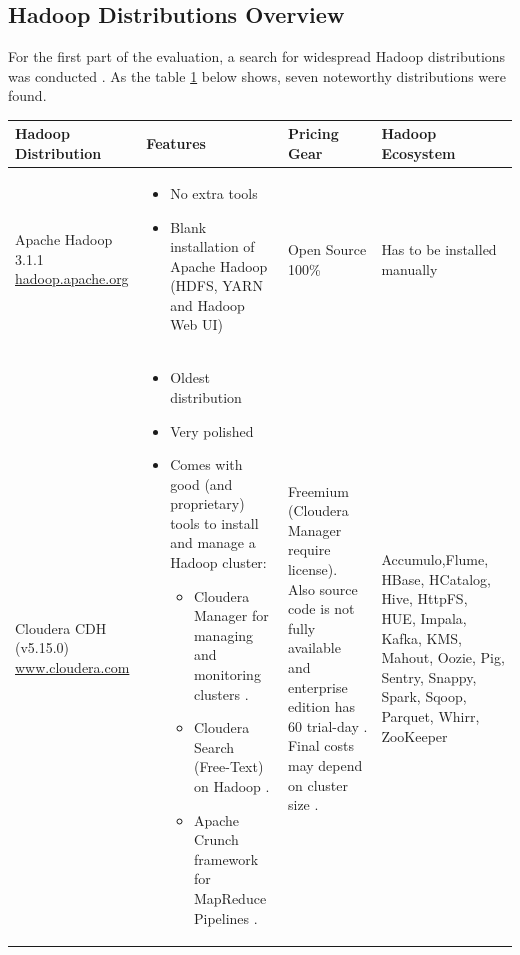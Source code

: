 \subsection{Hadoop Distributions Overview}\label{hd}
For the first part of the evaluation, a search for widespread Hadoop distributions was conducted \citep{hadoopvendors,forrester,comparison2014,Cloudera,M.Heo2015}.
As the table \ref{tab:distributions} below shows, seven noteworthy distributions were found.
\begin{table}[H]
\hspace{-3.3cm}
\begin{tabular}{|p{4.4cm}|p{6.2cm}|p{4cm}|p{4cm}|}
	\hline
	\textbf{Hadoop \newline Distribution} & \textbf{Features} & \textbf{ Pricing Gear}  & \textbf{ Hadoop \newline Ecosystem}\\ \hline
	Apache Hadoop 3.1.1
\href{http://hadoop.apache.org/}{hadoop.apache.org} & 
\begin{itemize}[noitemsep,leftmargin=*]
   \item No extra tools
   \item Blank installation of Apache Hadoop (HDFS, YARN and Hadoop Web UI)
\end{itemize}
& Open Source 100\% & Has to be
installed
manually \citep{apachehadoop}\\ \hline
Cloudera CDH (v5.15.0)
\href{https://www.cloudera.com/}{www.cloudera.com} & \begin{itemize}[noitemsep,leftmargin=*]
   \item Oldest distribution
   \item Very polished
   \item Comes with good (and proprietary)
tools to install and manage a Hadoop
cluster: \begin{itemize}
\item Cloudera Manager for managing
and monitoring clusters \citep{Cloudera2018a}.
\item Cloudera Search (Free-Text) on
Hadoop \citep{Cloudera2018}.
\item Apache Crunch framework for
MapReduce Pipelines \citep{Cloudera2018}.
\end{itemize}
\end{itemize} &Freemium (Cloudera Manager require license). Also source code is not fully available and enterprise edition has 60 trial-day \citep{D.Kumar2016}. Final costs may depend on cluster size \citep{Cloudera}.  &Accumulo,Flume, HBase, HCatalog, Hive, HttpFS, HUE, Impala, Kafka, KMS, Mahout, Oozie, Pig, Sentry, Snappy, Spark, Sqoop, Parquet, Whirr, ZooKeeper \citep{Cloudera2018a,Cloudera2018}\\ \hline
\end{tabular}
\label{tab:distributions}
\end{table}
